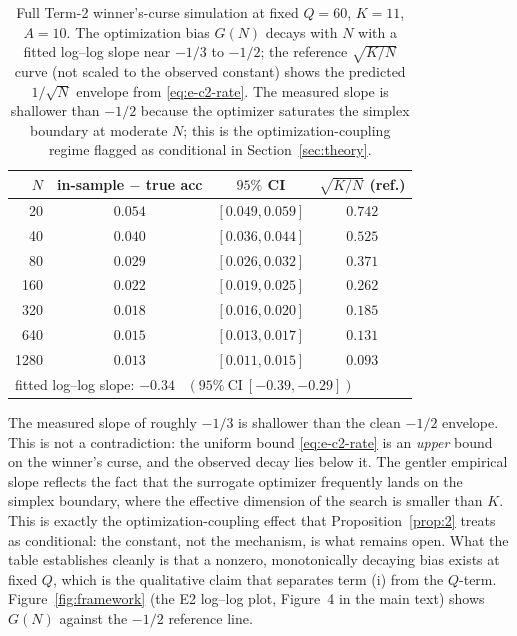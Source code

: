 \documentclass{article} %
\begin{document}
\begin{table}[t]
\centering
\small
\begin{tabular}{rccc}
\toprule
$N$ & in-sample $-$ true acc & $95\%$ CI & $\sqrt{K/N}$ (ref.) \\
\midrule
20   & $0.054$ & $[0.049,0.059]$ & $0.742$ \\
40   & $0.040$ & $[0.036,0.044]$ & $0.525$ \\
80   & $0.029$ & $[0.026,0.032]$ & $0.371$ \\
160  & $0.022$ & $[0.019,0.025]$ & $0.262$ \\
320  & $0.018$ & $[0.016,0.020]$ & $0.185$ \\
640  & $0.015$ & $[0.013,0.017]$ & $0.131$ \\
1280 & $0.013$ & $[0.011,0.015]$ & $0.093$ \\
\midrule
\multicolumn{4}{l}{fitted log--log slope: $-0.34$ \ $(95\%\ \mathrm{CI}\ [-0.39,-0.29])$} \\
\bottomrule
\end{tabular}
\caption{Full Term-2 winner's-curse simulation at fixed $Q=60$, $K=11$,
$A=10$.  The optimization bias $G(N)$ decays with $N$ with a fitted log--log
slope near $-1/3$ to $-1/2$; the reference $\sqrt{K/N}$ curve (not scaled to
the observed constant) shows the predicted $1/\sqrt N$ envelope from
\eqref{eq:e-c2-rate}.  The measured slope is shallower than $-1/2$ because the
optimizer saturates the simplex boundary at moderate $N$; this is the
optimization-coupling regime flagged as conditional in Section~\ref{sec:theory}.}
\label{tab:ablation}
\end{table}

The measured slope of roughly $-1/3$ is shallower than the clean $-1/2$
envelope.  This is not a contradiction: the uniform bound \eqref{eq:e-c2-rate}
is an \emph{upper} bound on the winner's curse, and the observed decay lies
below it.  The gentler empirical slope reflects the fact that the surrogate
optimizer frequently lands on the simplex boundary, where the effective
dimension of the search is smaller than $K$.  This is exactly the
optimization-coupling effect that Proposition~\ref{prop:2} treats as
conditional: the constant, not the mechanism, is what remains open.  What the
table establishes cleanly is that a nonzero, monotonically decaying bias
exists at fixed $Q$, which is the qualitative claim that separates term (i)
from the $Q$-term.  Figure~\ref{fig:framework} (the E2 log--log plot,
Figure~4 in the main text) shows $G(N)$ against the $-1/2$ reference line.
\end{document}
